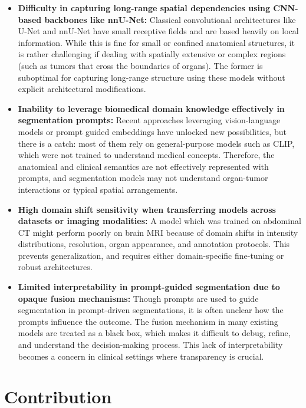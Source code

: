 \documentclass{cls/iutbscthesis}
\begin{document}
\begin{itemize}
    \item \textbf{Difficulty in capturing long-range spatial dependencies using CNN-based backbones like nnU-Net:} Classical convolutional architectures like U-Net and nnU-Net have small receptive fields and are based heavily on local information. While this is fine for small or confined anatomical structures, it is rather challenging if dealing with spatially extensive or complex regions (such as tumors that cross the boundaries of organs). The former is suboptimal for capturing long-range structure using these models without explicit architectural modifications.

    \item \textbf{Inability to leverage biomedical domain knowledge effectively in segmentation prompts:} Recent approaches leveraging vision-language models or prompt guided embeddings have unlocked new possibilities, but there is a catch: most of them rely on general-purpose models such as CLIP, which were not trained to understand medical concepts. Therefore, the anatomical and clinical semantics are not effectively represented with prompts, and segmentation models may not understand organ-tumor interactions or typical spatial arrangements.

    \item \textbf{High domain shift sensitivity when transferring models across datasets or imaging modalities:}
    A model which was trained on abdominal CT might perform poorly on brain MRI because of domain shifts in intensity distributions, resolution, organ appearance, and annotation protocols. This prevents generalization, and requires either domain-specific fine-tuning or robust architectures.

    \item \textbf{Limited interpretability in prompt-guided segmentation due to opaque fusion mechanisms: } Though prompts are used to guide segmentation in prompt-driven segmentations, it is often unclear how the prompts influence the outcome. The fusion mechanism in many existing models are treated as a black box, which makes it difficult to debug, refine, and understand the decision-making process. This lack of interpretability becomes a concern in clinical settings where transparency is crucial.
\end{itemize}
\section{Contribution}
\end{document}
